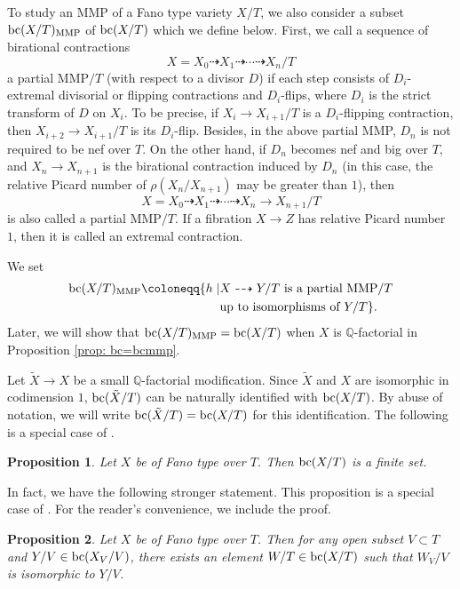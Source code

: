 \documentclass[11pt,oneside,reqno]{amsart}
\numberwithin{equation}{section}
\newtheorem{proposition}{Proposition}[section]
\theoremstyle{definition}
\newcommand{\bc}{{\rm {bc}}}
\newcommand{\dto}{\dashrightarrow}
\newcommand{\bQ}{\mathbb{Q}}
\begin{document}
To study an MMP of a Fano type variety $X/T$, we also consider a subset $\bc(X/T)_{\rm MMP}$ of $\bc(X/T)$ which we define below. First, we call a sequence of birational contractions
\[
X=X_0 \dto X_1 \dto \cdots \dto X_{n}/T
\] a partial MMP$/T$ (with respect to a divisor $D$) if each step consists of $D_i$-extremal divisorial or flipping contractions and $D_i$-flips, where $D_i$ is the strict transform of $D$ on $X_i$. To be precise, if $X_i \to X_{i+1}/T$ is a $D_i$-flipping contraction, then $X_{i+2} \to X_{i+1}/T$ is its $D_i$-flip. Besides, in the above partial MMP, $D_n$ is not required to be nef over $T$. On the other hand, if $D_{n}$ becomes nef and big over $T$, and $X_{n} \to X_{n+1}$ is the birational contraction induced by $D_n$ (in this case, the relative Picard number of $\rho(X_n/X_{n+1})$ may be greater than $1$), then
\[
X=X_0 \dto X_1 \dto \cdots \dto X_{n}\to X_{n+1}/T
\] is also called a partial MMP$/T$. If a fibration $X \to Z$ has relative Picard number $1$, then it is called an extremal contraction.

We set
\begin{equation}\label{eq: partial MMP}
\begin{split}
    \bc(X/T)_{\rm MMP}\coloneqq \{h \mid &X \dasharrow Y/T \text{~is a partial~} \text{MMP}/T \\
    &\text{up to isomorphisms of~} Y/T \}.
\end{split}
\end{equation} 
Later, we will show that $\bc(X/T)_{\rm MMP}=\bc(X/T)$ when $X$ is $\bQ$-factorial in Proposition \ref{prop: bc=bcmmp}.

Let $\tilde X \to X$ be a small $\bQ$-factorial modification. Since $\tilde X$ and $X$ are isomorphic in codimension $1$, $\bc(\tilde X/T)$ can be naturally identified with $\bc(X/T)$. By abuse of notation, we will write $\bc(\tilde X/T)=\bc(X/T)$ for this identification.  The following is a special case of \cite[Corollary 1.1.5]{BCHM10}.

\begin{proposition}\label{prop: finiteness}
Let $X$ be of Fano type over $T$. Then $\bc(X/T)$ is a finite set.
\end{proposition}

In fact, we have the following stronger statement. This proposition is a special case of \cite[Proposition 6.11]{CLLZ25}. For the reader's convenience, we include the proof.

\begin{proposition}\label{prop: strong finiteness}
Let $X$ be of Fano type over $T$. Then for any open subset $V\subset T$ and $Y/V\in \bc(X_V/V)$, there exists an element $W/T\in \bc(X/T)$ such that $W_V/V$ is isomorphic to $Y/V$.
\end{proposition}
\end{document}
